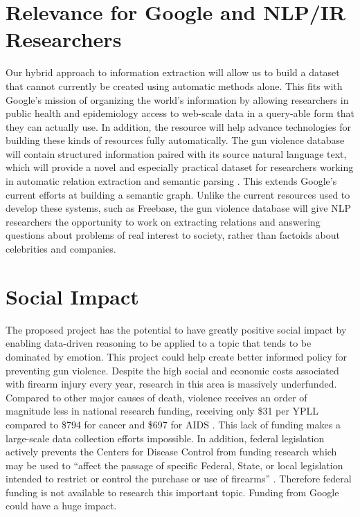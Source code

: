 \documentclass[11pt]{article}
\begin{document}
\section{Relevance for Google and NLP/IR Researchers}

Our hybrid approach to information extraction will allow us to build a dataset that cannot currently be created using automatic methods alone. This fits with Google's mission of organizing the world's information by allowing researchers in public health and epidemiology access to web-scale data in a query-able form that they can actually use. In addition, the resource will help advance technologies for building these kinds of resources fully automatically. The gun violence database will contain structured information paired with its source natural language text, which will provide a novel and especially practical dataset for researchers working in automatic relation extraction and semantic parsing \cite{mintz2009distant} \cite{cai2013semantic} \cite{yao2014information}.  This extends Google's current efforts at building a semantic graph.  Unlike the current resources used to develop these systems, such as Freebase, the gun violence database will give NLP researchers the opportunity to work on extracting relations and answering questions about problems of real interest to society, rather than factoids about celebrities and companies. 

\section{Social Impact}

The proposed project has the potential to have greatly positive social impact by enabling data-driven reasoning to be applied to a topic that tends to be dominated by emotion.  This project could help create better informed policy for preventing gun violence. Despite the high social and economic costs associated with firearm injury every year, research in this area is massively underfunded. Compared to other major causes of death, violence receives an order of magnitude less in national research funding, receiving only \$31 per YPLL compared to \$794 for cancer and \$697 for AIDS \cite{roth1993understanding}. This lack of funding makes a large-scale data collection efforts impossible. In addition, federal legislation actively prevents the Centers for Disease Control  from funding research which may be used to ``affect the passage of specific Federal, State, or local legislation intended to restrict or control the purchase or use of firearms'' \cite{kassirer1995partisan}.  Therefore federal funding is not available to research this important topic.  Funding from Google could have a huge impact.
\end{document}
